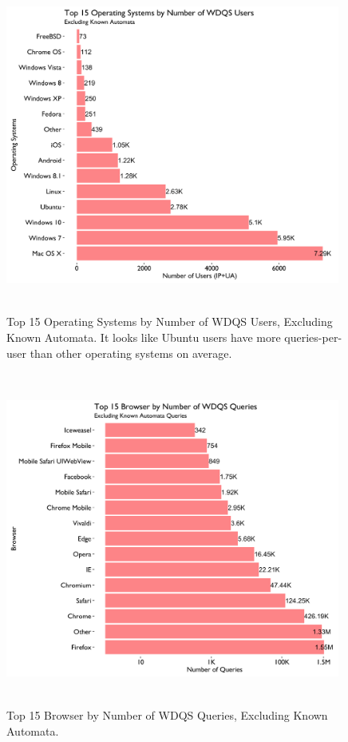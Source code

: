 \documentclass[12pt,]{article}
\begin{document}
\begin{figure}[H]
\centering
\includegraphics[width=11cm,height=11cm,keepaspectratio]{figures/n_user_by_os.png}
\caption{Top 15 Operating Systems by Number of WDQS Users, Excluding
Known Automata. It looks like Ubuntu users have more queries-per-user
than other operating systems on average.}
\end{figure}

\begin{figure}[H]
\centering
\includegraphics[width=11cm,height=11cm,keepaspectratio]{figures/n_query_by_browser.png}
\caption{Top 15 Browser by Number of WDQS Queries, Excluding Known
Automata.}
\end{figure}
\end{document}
